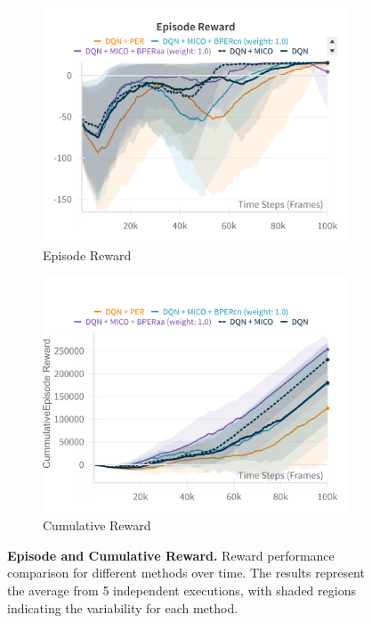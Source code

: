 \begin{figure}[!h]
    \centering
    \begin{subfigure}{0.45\textwidth}
    \includegraphics[width=\linewidth]{Results/grid_world/episode_reward_grid_world_window_100.png}
        \caption{Episode Reward}
        \label{fig:episode_reward_grid_world}
    \end{subfigure}
    \hfill
    \begin{subfigure}{0.45\textwidth}
        \includegraphics[width=\linewidth]{Results/grid_world/cumulative_episode_return.png}
        \caption{Cumulative Reward}
        \label{fig:cumulative_reward}
    \end{subfigure}
    \caption[Episode and Cumulative Reward]{\textbf{Episode and Cumulative Reward.} Reward performance comparison for different methods over time. The results represent the average from 5 independent executions, with shaded regions indicating the variability for each method.}
    \label{fig:cumulative_episode_reward}
\end{figure}

